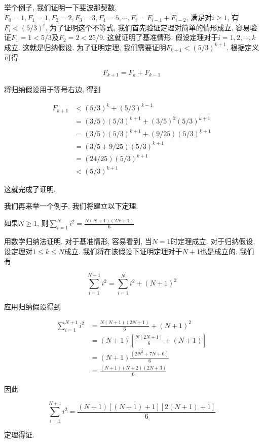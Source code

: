 \documentclass[oneside]{ctexbook}
\begin{document}
举个例子, 我们证明一下斐波那契数, $F_0=1,F_1=1,F_2=2,F_3=3,F_4=5,\cdots,F_i=F_{i-1}+F_{i-2}$, 满足对$i\geq 1$, 有$F_i<(5/3)^i$. 为了证明这个不等式, 我们首先验证定理对简单的情形成立. 容易验证$F_1=1<5/3$及$F_2=2<25/9$. 这就证明了基准情形. 假设定理对于$i=1,2,\cdots,k$成立. 这就是归纳假设. 为了证明定理, 我们需要证明$F_{k+1}<(5/3)^{k+1}$. 根据定义可得

\begin{equation*}
    F_{k+1} = F_k + F_{k-1}
\end{equation*}

将归纳假设用于等号右边, 得到

\begin{equation*}
    \begin{split}
        F_{k+1} &< (5/3)^k + (5/3)^{k-1} \\
                &= (3/5)(5/3)^{k+1} + (3/5)^2(5/3)^{k+1} \\
                &= (3/5)(5/3)^{k+1} + (9/25)(5/3)^{k+1} \\
                &= (3/5+9/25)(5/3)^{k+1} \\
                &= (24/25)(5/3)^{k+1} \\
                &< (5/3)^{k+1}
    \end{split}
\end{equation*}

这就完成了证明.

我们再来举一个例子, 我们将建立以下定理.

\begin{mytheorem}{}{}
    如果$N\geq 1$, 则$\sum_{i=1}^{N}i^2=\frac{N(N+1)(2N+1)}{6}$
\end{mytheorem}

\begin{myproof}{}{}
    用数学归纳法证明. 对于基准情形, 容易看到, 当$N=1$时定理成立. 对于归纳假设, 设定理对$1\leq k\leq N$成立. 我们将在该假设下证明定理对于$N+1$也是成立的. 我们有

    \begin{equation*}
        \sum_{i=1}^{N+1}i^2=\sum_{i=1}^{N}i^2+(N+1)^2
    \end{equation*}

    应用归纳假设得到

    \begin{equation*}
        \begin{split}
            \sum_{i=1}^{N+1}i^2 &= \frac{N(N+1)(2N+1)}{6} + (N+1)^2 \\
                                &= (N+1)[\frac{N(2N+1)}{6} + (N+1)] \\
                                &= (N+1)\frac{(2N^2+7N+6)}{6} \\
                                &= \frac{(N+1)(N+2)(2N+3)}{6}
        \end{split}
    \end{equation*}

    因此

    \begin{equation*}
        \sum_{i=1}^{N+1}i^2 = \frac{(N+1)[(N+1)+1][2(N+1)+1]}{6}
    \end{equation*}

    定理得证.
\end{myproof}
\end{document}
